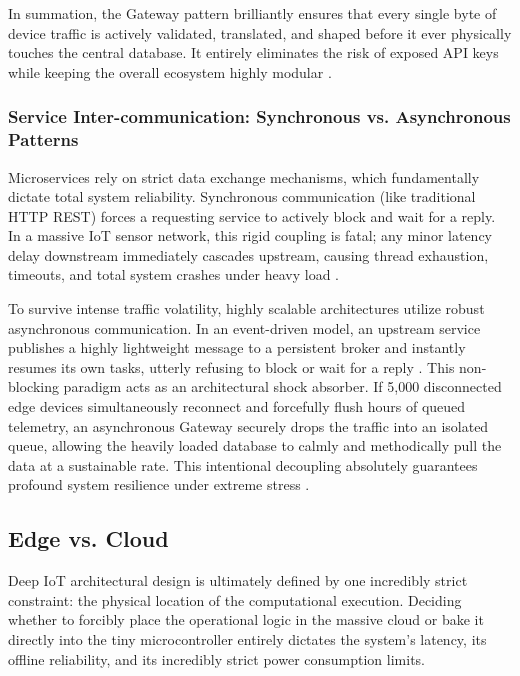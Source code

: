 In summation, the Gateway pattern brilliantly ensures that every single byte of device traffic is actively validated, translated, and shaped before it ever physically touches the central database. It entirely eliminates the risk of exposed API keys while keeping the overall ecosystem highly modular \cite{microservices_io_apigateway}.

\subsubsection{Service Inter-communication: Synchronous vs. Asynchronous Patterns}

Microservices rely on strict data exchange mechanisms, which fundamentally dictate total system reliability. Synchronous communication (like traditional HTTP REST) forces a requesting service to actively block and wait for a reply. In a massive IoT sensor network, this rigid coupling is fatal; any minor latency delay downstream immediately cascades upstream, causing thread exhaustion, timeouts, and total system crashes under heavy load \cite{gfg_microservices_communication}.

To survive intense traffic volatility, highly scalable architectures utilize robust asynchronous communication. In an event-driven model, an upstream service publishes a highly lightweight message to a persistent broker and instantly resumes its own tasks, utterly refusing to block or wait for a reply \cite{gfg_sync_vs_async_system_design}. This non-blocking paradigm acts as an architectural shock absorber. If 5,000 disconnected edge devices simultaneously reconnect and forcefully flush hours of queued telemetry, an asynchronous Gateway securely drops the traffic into an isolated queue, allowing the heavily loaded database to calmly and methodically pull the data at a sustainable rate. This intentional decoupling absolutely guarantees profound system resilience under extreme stress \cite{cerbos_inter_service_communication}.

\subsection{Edge vs. Cloud}

Deep IoT architectural design is ultimately defined by one incredibly strict constraint: the physical location of the computational execution. Deciding whether to forcibly place the operational logic in the massive cloud or bake it directly into the tiny microcontroller entirely dictates the system's latency, its offline reliability, and its incredibly strict power consumption limits.

